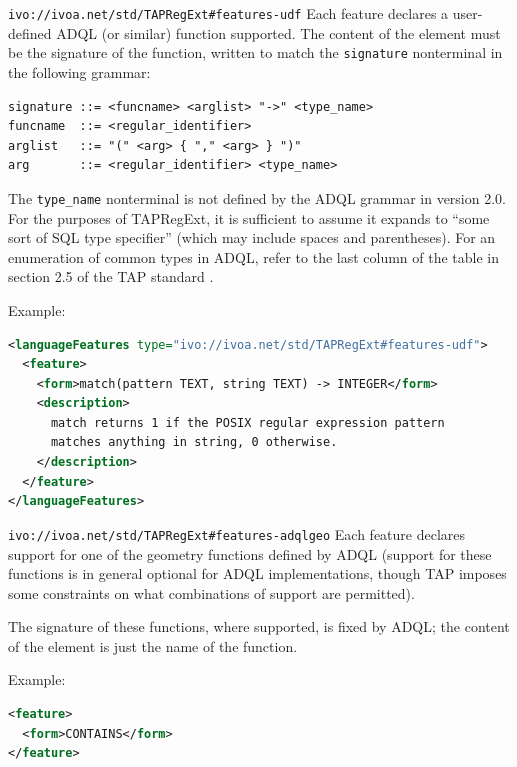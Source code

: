 \documentclass{ivoa}
\begin{document}
\begin{bigdescription}
\item[\nolinkurl{ivo://ivoa.net/std/TAPRegExt\#features-udf}] Each feature declares a user-defined ADQL (or similar) function supported.
    The content of the  element
    must be the signature of the function, written to match the
    \texttt{signature} nonterminal in the following grammar:


\begin{verbatim}
signature ::= <funcname> <arglist> "->" <type_name>
funcname  ::= <regular_identifier>
arglist   ::= "(" <arg> { "," <arg> } ")"
arg       ::= <regular_identifier> <type_name>
\end{verbatim}

The \texttt{type\_name} nonterminal is not defined by the ADQL
		grammar in version 2.0. 
		For the purposes of TAPRegExt, it is sufficient to assume
		it expands to ``some sort of SQL type specifier'' (which may
		include spaces and parentheses).  For an enumeration of common types
		in ADQL, refer to the last column of the table in section 2.5 of 
		the TAP standard \citep{std:TAP}.

Example:


\begin{lstlisting}[language=XML,basicstyle=\footnotesize]
<languageFeatures type="ivo://ivoa.net/std/TAPRegExt#features-udf">
  <feature>
    <form>match(pattern TEXT, string TEXT) -> INTEGER</form>
    <description>
      match returns 1 if the POSIX regular expression pattern 
      matches anything in string, 0 otherwise.
    </description>
  </feature>
</languageFeatures>
\end{lstlisting}


\item[\nolinkurl{ivo://ivoa.net/std/TAPRegExt\#features-adqlgeo}] Each feature declares support for one of the geometry functions 
		defined by ADQL
    (support for these functions is in general optional for ADQL
    implementations, though TAP imposes some constraints on what 
    combinations of support are permitted).

The signature of these functions, where supported, is fixed by ADQL;
    the content of the  element
    is just the name of the function.

Example:


\begin{lstlisting}[language=XML,basicstyle=\footnotesize]
<feature>
  <form>CONTAINS</form>
</feature>
\end{lstlisting}



\end{bigdescription}
\end{document}
